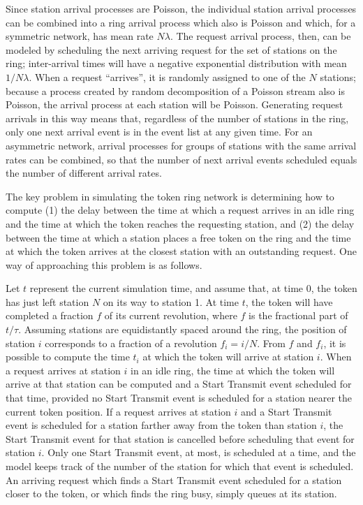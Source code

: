 Since station arrival processes are Poisson, the individual station arrival processes can be combined into a ring arrival process which also is Poisson and which, for a symmetric network, has mean rate $N\lambda$. The request arrival process, then, can be modeled by scheduling the next arriving request for the set of stations on the ring; inter-arrival times will have a negative exponential distribution with mean $1/N\lambda$. When a request ``arrives'', it is randomly assigned to one of the $N$ stations; because a process created by random decomposition of a Poisson stream also is Poisson, the arrival process at each station will be Poisson. Generating request arrivals in this way means that, regardless of the number of stations in the ring, only one next arrival event is in the event list at any given time. For an asymmetric network, arrival processes for groups of stations with the same arrival rates can be combined, so that the number of next arrival events scheduled equals the number of different arrival rates.

The key problem in simulating the token ring network is determining how to compute (1) the delay between the time at which a request arrives in an idle ring and the time at which the token reaches the requesting station, and (2) the delay between the time at which a station places a free token on the ring and the time at which the token arrives at the closest station with an outstanding request. One way of approaching this problem is as follows.

Let $t$ represent the current simulation time, and assume that, at time 0, the token has just left station $N$ on its way to station 1. At time $t$, the token will have completed a fraction $f$ of its current revolution, where $f$ is the fractional part of $t/\tau$. Assuming stations are equidistantly spaced around the ring, the position of station $i$ corresponds to a fraction of a revolution $f_i=i/N$. From $f$ and $f_i$, it is possible to compute the time $t_i$ at which the token will arrive at station $i$. When a request arrives at station $i$ in an idle ring, the time at which the token will arrive at that station can be computed and a Start Transmit event scheduled for that time, provided no Start Transmit event is scheduled for a station nearer the current token position. If a request arrives at station $i$ and a Start Transmit event is scheduled for a station farther away from the token than station $i$, the Start Transmit event for that station is cancelled before scheduling that event for station $i$. Only one Start Transmit event, at most, is scheduled at a time, and the model keeps track of the number of the station for which that event is scheduled. An arriving request which finds a Start Transmit event scheduled for a station closer to the token, or which finds the ring busy, simply queues at its station.

